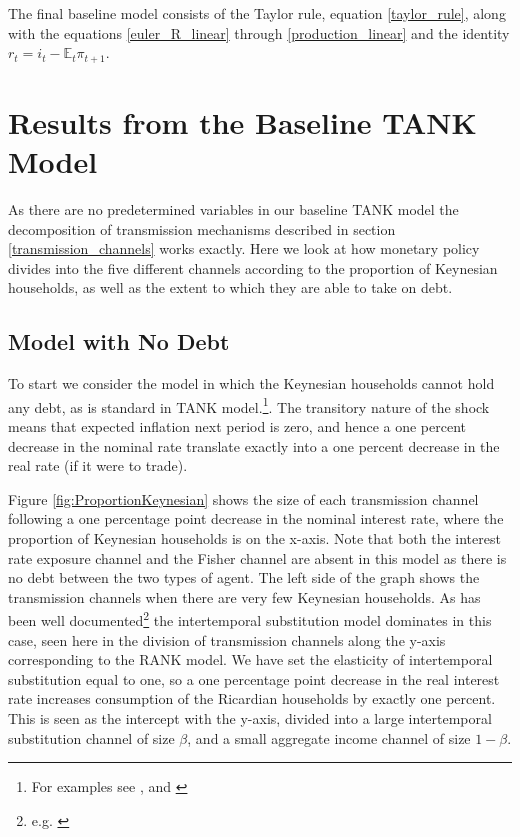 \documentclass[titlepage]{\econtex}\newcommand{\texname}{ConsumptionHeterogeneity}
\begin{document}
The final baseline model consists of the Taylor rule, equation \ref{taylor_rule}, along with the equations \ref{euler_R_linear} through \ref{production_linear} and the identity $r_t = i_t - \mathbb{E}_t \pi_{t+1}$.

\section{Results from the Baseline TANK Model}
As there are no predetermined variables in our baseline TANK model the decomposition of transmission mechanisms described in section \ref{transmission_channels} works exactly. Here we look at how monetary policy divides into the five different channels according to the proportion of Keynesian households, as well as the extent to which they are able to take on debt.

\subsection{Model with No Debt}
To start we consider the model in which the Keynesian households cannot hold any debt, as is standard in TANK model.\footnote{For examples see \cite{dgHANKTANK}, \cite{gali_understanding_2007} and \cite{broer_2018}}. The transitory nature of the shock means that expected inflation next period is zero, and hence a one percent decrease in the nominal rate translate exactly into a one percent decrease in the real rate (if it were to trade).

Figure \ref{fig:ProportionKeynesian} shows the size of each transmission channel following a one percentage point decrease in the nominal interest rate, where the proportion of Keynesian households is on the x-axis. Note that both the interest rate exposure channel and the Fisher channel are absent in this model as there is no debt between the two types of agent. The left side of the graph shows the transmission channels when there are very few Keynesian households. As has been well documented\footnote{e.g. \cite{kaplan_monetary_2016}} the intertemporal substitution model dominates in this case, seen here in the division of transmission channels along the y-axis corresponding to the RANK model. We have set the elasticity of intertemporal substitution equal to one, so a one percentage point decrease in the real interest rate increases consumption of the Ricardian households by exactly one percent. This is seen as the intercept with the y-axis, divided into a large intertemporal substitution channel of size $\beta$, and a small aggregate income channel of size $1-\beta$.
\end{document}
